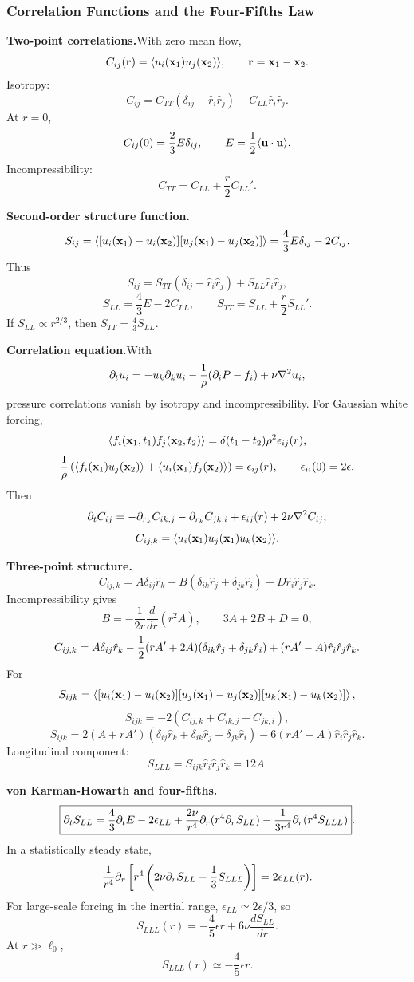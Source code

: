 \subsubsection*{Correlation Functions and the Four-Fifths Law}

\noindent\textbf{Two-point correlations.}\quad With zero mean flow,
\[
  C_{ij}(\mathbf r)=\langle u_i(\mathbf{x}_1)u_j(\mathbf{x}_2)\rangle,
  \qquad
  \mathbf r=\mathbf{x}_1-\mathbf{x}_2.
\]
Isotropy:
\[
  \boxed{C_{ij}=C_{TT}(\delta_{ij}-\hat r_i\hat r_j)+C_{LL}\hat r_i\hat r_j}.
\]
At $r=0$,
\[
  C_{ij}(0)=\frac23E\delta_{ij},
  \qquad
  E=\frac{1}{2}\langle\mathbf{u}\cdot\mathbf{u}\rangle.
\]
Incompressibility:
\[
  \boxed{C_{TT}=C_{LL}+\frac{r}{2}C_{LL}'}.
\]

\noindent\textbf{Second-order structure function.}\quad
\[
  S_{ij}=
  \left\langle [u_i(\mathbf{x}_1)-u_i(\mathbf{x}_2)]
  [u_j(\mathbf{x}_1)-u_j(\mathbf{x}_2)]\right\rangle
  =\frac43E\delta_{ij}-2C_{ij}.
\]
Thus
\[
  S_{ij}=S_{TT}(\delta_{ij}-\hat r_i\hat r_j)+S_{LL}\hat r_i\hat r_j,
\]
\[
  \boxed{S_{LL}=\frac43E-2C_{LL}},
  \qquad
  \boxed{S_{TT}=S_{LL}+\frac{r}{2}S_{LL}'}.
\]
If $S_{LL}\propto r^{2/3}$, then $S_{TT}=\frac43S_{LL}$.

\noindent\textbf{Correlation equation.}\quad With
\[
  \partial_tu_i=-u_k\partial_ku_i-\frac1\rho(\partial_iP-f_i)+\nu\nabla^2u_i,
\]
pressure correlations vanish by isotropy and incompressibility. For Gaussian white forcing,
\[
  \langle f_i(\mathbf{x}_1,t_1)f_j(\mathbf{x}_2,t_2)\rangle
  =\delta(t_1-t_2)\rho^2\epsilon_{ij}(r),
\]
\[
  \frac1\rho\left(\langle f_i(\mathbf{x}_1)u_j(\mathbf{x}_2)\rangle
  +\langle u_i(\mathbf{x}_1)f_j(\mathbf{x}_2)\rangle\right)=\epsilon_{ij}(r),
  \qquad
  \epsilon_{ii}(0)=2\epsilon.
\]
Then
\[
  \partial_t C_{ij}
  =-\partial_{r_k}C_{ik,j}-\partial_{r_k}C_{jk,i}
  +\epsilon_{ij}(r)+2\nu\nabla^2C_{ij},
\]
\[
  C_{ij,k}=\langle u_i(\mathbf{x}_1)u_j(\mathbf{x}_1)u_k(\mathbf{x}_2)\rangle.
\]

\noindent\textbf{Three-point structure.}\quad
\[
  C_{ij,k}=A\delta_{ij}\hat r_k
  +B(\delta_{ik}\hat r_j+\delta_{jk}\hat r_i)
  +D\hat r_i\hat r_j\hat r_k.
\]
Incompressibility gives
\[
  \boxed{B=-\frac1{2r}\frac{d}{dr}(r^2A)},
  \qquad
  \boxed{3A+2B+D=0},
\]
\[
  C_{ij,k}=A\delta_{ij}\hat r_k
  -\frac{1}{2}(rA'+2A)(\delta_{ik}\hat r_j+\delta_{jk}\hat r_i)
  +(rA'-A)\hat r_i\hat r_j\hat r_k.
\]
For
\[
  S_{ijk}=
  \left\langle [u_i(\mathbf{x}_1)-u_i(\mathbf{x}_2)]
  [u_j(\mathbf{x}_1)-u_j(\mathbf{x}_2)]
  [u_k(\mathbf{x}_1)-u_k(\mathbf{x}_2)]\right\rangle,
\]
\[
  S_{ijk}=-2(C_{ij,k}+C_{ik,j}+C_{jk,i}),
\]
\[
  S_{ijk}=2(A+rA')(\delta_{ij}\hat r_k+\delta_{ik}\hat r_j+\delta_{jk}\hat r_i)
  -6(rA'-A)\hat r_i\hat r_j\hat r_k.
\]
Longitudinal component:
\[
  \boxed{S_{LLL}=S_{ijk}\hat r_i\hat r_j\hat r_k=12A}.
\]

\noindent\textbf{von Karman-Howarth and four-fifths.}\quad
\[
  \boxed{\partial_t S_{LL}
  =\frac43\partial_tE-2\epsilon_{LL}
  +\frac{2\nu}{r^4}\partial_r(r^4\partial_rS_{LL})
  -\frac1{3r^4}\partial_r(r^4S_{LLL})}.
\]
In a statistically steady state,
\[
  \frac1{r^4}\partial_r\left[r^4\left(2\nu\partial_rS_{LL}-\frac13S_{LLL}\right)\right]
  =2\epsilon_{LL}(r).
\]
For large-scale forcing in the inertial range, $\epsilon_{LL}\simeq2\epsilon/3$, so
\[
  \boxed{S_{LLL}(r)=-\frac45\epsilon r+6\nu\frac{dS_{LL}}{dr}}.
\]
At $r\gg\ell_0$,
\[
  \boxed{S_{LLL}(r)\simeq-\frac45\epsilon r}.
\]
